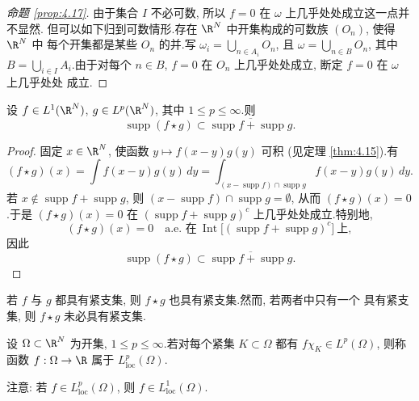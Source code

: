 \begin{proof}[命题 \ref{prop:4.17}]
由于集合 $I$ 不必可数, 所以 $f=0$ 在 $\omega$ 上几乎处处成立这一点并不显然.
但可以如下归到可数情形.存在 $\R^N$ 中开集构成的可数族 $(O_n)$, 使得 $\R^N$ 中
每个开集都是某些 $O_n$ 的并.写 $\omega_i=\bigcup_{n\in A_i}O_n$, 且
$\omega=\bigcup_{n\in B}O_n$, 其中 $B=\bigcup_{i\in I}A_i$.由于对每个
$n\in B$, $f=0$ 在 $O_n$ 上几乎处处成立, 断定 $f=0$ 在 $\omega$ 上几乎处处
成立.
\end{proof}

\begin{keyproposition}
\label{prop:4.18}
设 $f\in L^1(\R^N)$, $g\in L^p(\R^N)$, 其中 $1\le p\le\infty$.则
\begin{equation*}
\boxed{\operatorname{supp}(f\star g)\subset\overline{\operatorname{supp}f
+\operatorname{supp}g}.}
\end{equation*}
\end{keyproposition}

\begin{proof}
固定 $x\in\R^N$, 使函数 $y\mapsto f(x-y)g(y)$ 可积 (见定理  \ref{thm:4.15}).有
\begin{equation*}
(f\star g)(x)=\int f(x-y)g(y)\,dy
=\int_{(x-\operatorname{supp}f)\cap\operatorname{supp}g}f(x-y)g(y)\,dy.
\end{equation*}
若 $x\notin\operatorname{supp}f+\operatorname{supp}g$, 则
$(x-\operatorname{supp}f)\cap\operatorname{supp}g=\emptyset$, 从而
$(f\star g)(x)=0$.于是 $(f\star g)(x)=0$ 在
$(\operatorname{supp}f+\operatorname{supp}g)^c$ 上几乎处处成立.特别地,
\begin{equation*}
(f\star g)(x)=0\quad\text{a.e. 在}\
\operatorname{Int}\bigl[(\operatorname{supp}f+\operatorname{supp}g)^c\bigr]
\ \text{上},
\end{equation*}
因此
\begin{equation*}
\operatorname{supp}(f\star g)\subset\overline{\operatorname{supp}f
+\operatorname{supp}g}.
\end{equation*}
\end{proof}

\begin{keyremark}
\label{rem:4.10}
若 $f$ 与 $g$ 都具有紧支集, 则 $f\star g$ 也具有紧支集.然而, 若两者中只有一个
具有紧支集, 则 $f\star g$ 未必具有紧支集.
\end{keyremark}

\begin{definition}
设 $\Omega\subset\R^N$ 为开集, $1\le p\le\infty$.若对每个紧集 $K\subset\Omega$
都有 $f\chi_K\in L^p(\Omega)$, 则称函数 $f:\Omega\to\R$ 属于
$L^p_{\mathrm{loc}}(\Omega)$.

注意: 若 $f\in L^p_{\mathrm{loc}}(\Omega)$, 则 $f\in L^1_{\mathrm{loc}}(\Omega)$.
\end{definition}

